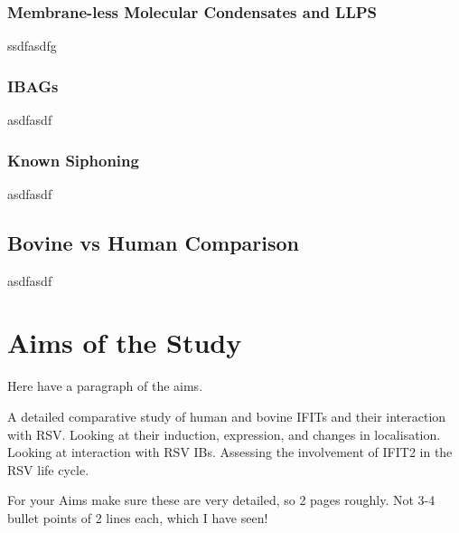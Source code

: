 \subsubsection{Membrane-less Molecular Condensates and LLPS} \label{Membrane-less Molecular Condensates and LLPS}
ssdfasdfg



\subsubsection{IBAGs} \label{IBAGs}
asdfasdf



\subsubsection{Known Siphoning} \label{Known Siphoning}
asdfasdf



\subsection{Bovine vs Human Comparison} \label{subsec:Bovine vs Human Comparison}
asdfasdf




\section{Aims of the Study} \label{sec:Aims}
Here have a paragraph of the aims.

A detailed comparative study of human and bovine IFITs and their interaction with RSV. Looking at their induction, expression, and changes in localisation. Looking at interaction with RSV IBs. Assessing the involvement of IFIT2 in the RSV life cycle.

For your Aims make sure these are very detailed, so 2 pages roughly. Not 3-4 bullet points of 2 lines each, which I have seen!


